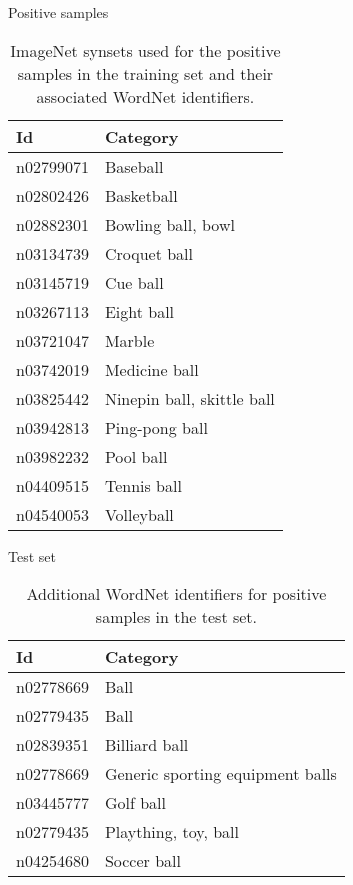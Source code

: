 \documentclass{beamer}
\begin{document}
\begin{frame}{Positive samples}
	\begin{table}[H]
		\footnotesize
		\centering
		\caption{ImageNet synsets used for the positive samples in the training set and their associated WordNet \citep{fellbaum1998wordnet} identifiers.}
		\label{tab:postraining}
		\begin{tabularx}{\textwidth}{lX}
			\toprule
			\textbf{Id} & \textbf{Category} \\
			\midrule
			n02799071 & Baseball \\
			n02802426 & Basketball \\
			n02882301 & Bowling ball, bowl \\
			n03134739 & Croquet ball \\
			n03145719 & Cue ball \\
			n03267113 & Eight ball \\
			n03721047 & Marble \\
			n03742019 & Medicine ball \\
			n03825442 & Ninepin ball, skittle ball \\
			n03942813 & Ping-pong ball \\
			n03982232 & Pool ball \\
			n04409515 & Tennis ball \\
			n04540053 & Volleyball \\
			\bottomrule
		\end{tabularx}
	\end{table}
\end{frame}

\begin{frame}{Test set}
	\begin{table}[H]
		\centering
		\caption{Additional WordNet identifiers for positive samples in the test set.}
		\label{tab:postest}
		\begin{tabularx}{\textwidth}{lX}
			\toprule
			\textbf{Id} & \textbf{Category} \\
			\midrule
				n02778669 & Ball \\
				n02779435 & Ball \\
				n02839351 & Billiard ball \\
				n02778669 & Generic sporting equipment balls \\
				n03445777 & Golf ball \\
				n02779435 & Plaything, toy, ball \\
				n04254680 & Soccer ball \\
			\bottomrule
		\end{tabularx}
	\end{table}
\end{frame}
\end{document}
